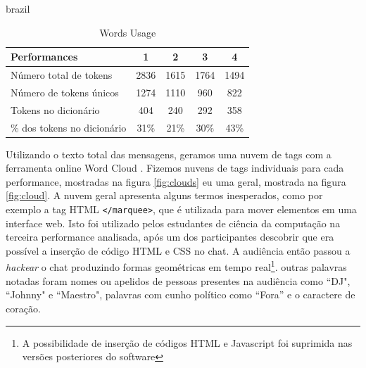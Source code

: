 \begin{otherlanguage*}{brazil}


\begin{table}[ht!]
\caption{Words Usage}{%
\begin{tabular}{@{}lcccc@{}}
\hline
Performances & 1 & 2 & 3 & 4 \\
\hline
Número total de tokens&     2836&   1615&  1764&   1494\\
Número de tokens únicos& 1274& 1110& 960& 822\\
Tokens no dicionário &      404&   240&  292&   358\\
\% dos tokens no dicionário &       31\%&   21\%&  30\%&   43\%\\
\end{tabular}}
\label{tab:words}
\end{table}

Utilizando o texto total das mensagens, geramos uma nuvem de tags com a ferramenta online Word Cloud \cite{JasonDavies}. Fizemos nuvens de tags individuais para cada performance, mostradas na figura \ref{fig:clouds} eu uma geral, mostrada na figura \ref{fig:cloud}. A nuvem geral apresenta alguns termos inesperados, como por exemplo a tag HTML \texttt{</marquee>}, que é utilizada para mover elementos em uma interface web. Isto foi utilizado pelos estudantes de ciência da computação na terceira performance analisada, após um dos participantes descobrir que era possível a inserção de código HTML e CSS no chat. A audiência então passou a \emph{hackear} o chat produzindo formas geométricas em tempo real\footnote{A possibilidade de inserção de códigos HTML e Javascript foi suprimida nas versões posteriores do software}. outras palavras notadas foram nomes ou apelidos de pessoas presentes na audiência como ``DJ", ``Johnny" e ``Maestro", palavras com cunho político como ``Fora'' e o caractere de coração. 



\end{otherlanguage*}
